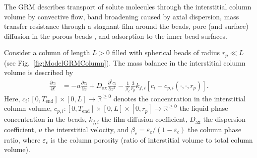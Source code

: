 The GRM describes transport of solute molecules through the interstitial column volume by convective flow, band broadening caused by axial dispersion, mass transfer resistance through a stagnant film around the beads, pore (and surface) diffusion in the porous beads \cite{Ma1996, Schneider1968a, Miyabe2007}, and adsorption to the inner bead surfaces.

Consider a column of length $L>0$ filled with spherical beads of radius $r_p \ll L$ (see Fig.~\ref{fig:ModelGRMColumn}). 
The mass balance in the interstitial column volume is described by
\begin{align}
	\frac{\partial c_i}{\partial t} &= -u \frac{\partial c_i}{\partial z} + D_{\text{ax}} \frac{\partial^2 c_i}{\partial z^2} - \frac{1}{\beta_c}\frac{3}{r_p}k_{f,i}\left[ c_i - c_{p,i}(\cdot, \cdot, r_p) \right]. \label{eq:ModelColumn}
\end{align}
Here, $c_i\colon \left[0, T_{\text{end}}\right] \times [0, L] \rightarrow \mathds{R}^{\geq 0}$ denotes the concentration in the interstitial column volume, $c_{p,i}\colon \left[0, T_{\text{end}}\right] \times [0, L] \times [0, r_p] \rightarrow \mathds{R}^{\geq 0}$ the liquid phase concentration in the beads, $k_{f,i}$ the film diffusion coefficient, $D_{\text{ax}}$ the dispersion coefficient, $u$ the interstitial velocity, and $\beta_c = \varepsilon_c / (1 - \varepsilon_c)$ the column phase ratio, where $\varepsilon_c$ is the column porosity (ratio of interstitial volume to total column volume).

